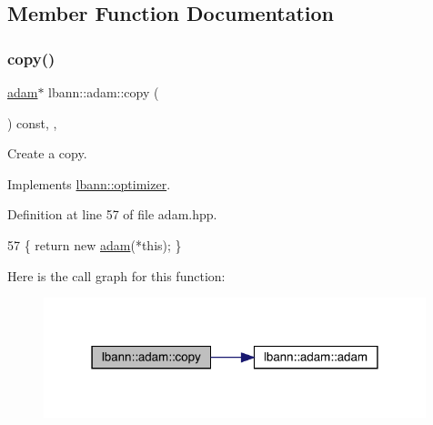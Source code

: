 \subsection{Member Function Documentation}
\mbox{\label{classlbann_1_1adam_a95866f94044a4e7bb34bf35551ade4cc}} 
\subsubsection{\texorpdfstring{copy()}{copy()}}
{\footnotesize\ttfamily \hyperlink{classlbann_1_1adam}{adam}$\ast$ lbann\+::adam\+::copy (\begin{DoxyParamCaption}{ }\end{DoxyParamCaption}) const\hspace{0.3cm}{\ttfamily [inline]}, {\ttfamily [override]}, {\ttfamily [virtual]}}

Create a copy. 

Implements \hyperlink{classlbann_1_1optimizer_adf19a1d19d832ebfe70072cc202cdf39}{lbann\+::optimizer}.



Definition at line 57 of file adam.\+hpp.


\begin{DoxyCode}
57 \{ \textcolor{keywordflow}{return} \textcolor{keyword}{new} \hyperlink{classlbann_1_1adam_a9d6848fa245bc2adfe142ae3aeb4e33d}{adam}(*\textcolor{keyword}{this}); \}
\end{DoxyCode}
Here is the call graph for this function\+:\nopagebreak
\begin{figure}[H]
\begin{center}
\leavevmode
\includegraphics[width=315pt]{classlbann_1_1adam_a95866f94044a4e7bb34bf35551ade4cc_cgraph}
\end{center}
\end{figure}
\mbox{\label{classlbann_1_1adam_a14eb9754e2aa38a732d92b6d42311676}} 
